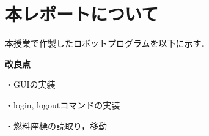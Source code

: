 \section{本レポートについて}
本授業で作製したロボットプログラムを以下に示す．

{\bf 改良点}

・GUIの実装

・login, logoutコマンドの実装

・燃料座標の読取り，移動
